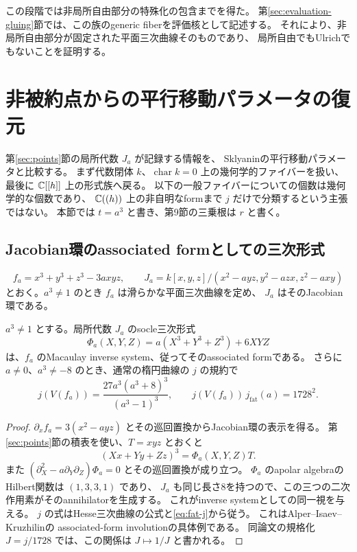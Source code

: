 この段階では非局所自由部分の特殊化の包含までを得た。
第\ref{sec:evaluation-gluing}節では、この族のgeneric fiberを評価核として記述する。
それにより、非局所自由部分が固定された平面三次曲線そのものであり、
局所自由でもUlrichでもないことを証明する。

\section{非被約点からの平行移動パラメータの復元}\label{sec:reconstruction}

第\ref{sec:points}節の局所代数 $J_a$ が記録する情報を、
Sklyaninの平行移動パラメータと比較する。
まず代数閉体 $k$、$\operatorname{char}k=0$ 上の幾何学的ファイバーを扱い、
最後に $\mathbb C[[h]]$ 上の形式族へ戻る。
以下の一般ファイバーについての個数は幾何学的な個数であり、
$\mathbb C((h))$ 上の非自明なformまで $j$ だけで分類するという主張ではない。
本節では $t=a^3$ と書き、第9節の三乗根は $r$ と書く。

\subsection{Jacobian環のassociated formとしての三次形式}

\[
 f_a=x^3+y^3+z^3-3axyz,\qquad
 J_a=k[x,y,z]/(x^2-ayz,y^2-azx,z^2-axy)
\]
とおく。$a^3\ne1$ のとき $f_a$ は滑らかな平面三次曲線を定め、
$J_a$ はそのJacobian環である。

\begin{theorem}\label{thm:fat-associated}
$a^3\ne1$ とする。局所代数 $J_a$ のsocle三次形式
\[
 \Phi_a(X,Y,Z)=a(X^3+Y^3+Z^3)+6XYZ
\]
は、$f_a$ のMacaulay inverse system、従ってそのassociated formである。
さらに $a\ne0$、$a^3\ne-8$ のとき、通常の楕円曲線の $j$ の規約で
\begin{equation}\label{eq:associated-reciprocal-j}
 j(V(f_a))=\frac{27a^3(a^3+8)^3}{(a^3-1)^3},\qquad
 j(V(f_a))\,j_{\mathrm{fat}}(a)=1728^2.
\end{equation}
\end{theorem}

\begin{proof}
$\partial_x f_a=3(x^2-ayz)$ とその巡回置換からJacobian環の表示を得る。
第\ref{sec:points}節の積表を使い、$T=xyz$ とおくと
\[
 (Xx+Yy+Zz)^3=\Phi_a(X,Y,Z)T.
\]
また $(\partial_X^2-a\partial_Y\partial_Z)\Phi_a=0$ とその巡回置換が成り立つ。
$\Phi_a$ のapolar algebraのHilbert関数は $(1,3,3,1)$ であり、
$J_a$ も同じ長さ8を持つので、この三つの二次作用素がそのannihilatorを生成する。
これがinverse systemとしての同一視を与える。
$j$ の式はHesse三次曲線の公式と\eqref{eq:fat-j}から従う。
これはAlper--Isaev--Kruzhilin\cite[Section 3.2, (3.11), (3.18)]{AIK}の
associated-form involutionの具体例である。
同論文の規格化 $J=j/1728$ では、この関係は $J\mapsto1/J$ と書かれる。
\end{proof}

